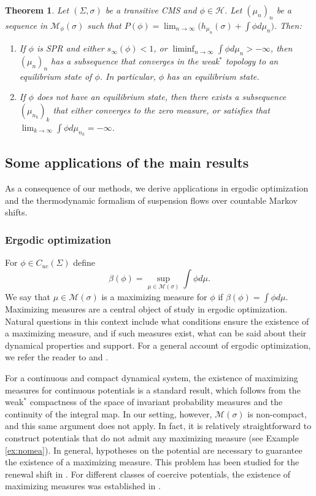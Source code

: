 \documentclass[letterpaper,11pt]{amsart}
\theoremstyle{plain}
\newtheorem{theorem}{Theorem}[section]
\theoremstyle{plain}
\theoremstyle{definition}
\theoremstyle{remark}
\def\M{{\mathcal M}}
\def\H{{\mathcal H}}
\begin{document}
\begin{theorem}\label{thm:2} Let $(\Sigma,\sigma)$ be a transitive CMS and $\phi\in\H$. Let $(\mu_n)_n$ be a sequence in $\M_{\phi}(\sigma)$ such that $P(\phi)=\lim_{n\to\infty} \big(h_{\mu_n}(\sigma)+\int \phi d\mu_n\big).$ Then:
\begin{enumerate}
\item\label{122} If $\phi$ is SPR and either $s_\infty(\phi)<1$, or $\liminf_{n\to\infty}\int \phi  d\mu_n>-\infty$, then  $(\mu_n)_n$ has a subsequence that converges in the weak$^*$ topology to an equilibrium state of $\phi$. In particular, $\phi$ has an equilibrium state.
\item \label{222} If $\phi$ does not have an equilibrium state, then there exists a subsequence  $(\mu_{n_k})_k$ that either converges to the zero measure, or satisfies that $\lim_{k\to\infty}\int \phi d\mu_{n_k}=-\infty$. 
\end{enumerate}
\end{theorem}


\subsection{Some applications of the main results} As a consequence of our methods, we derive applications in ergodic optimization and the thermodynamic formalism of suspension flows over countable Markov shifts. 

\subsubsection{Ergodic optimization} For $\phi\in C_{uc}(\Sigma)$ define $$\beta(\phi)=\sup_{\mu\in \M(\sigma)}\int \phi d\mu.$$ We say that $\mu\in\M(\sigma)$ is a maximizing measure for $\phi$ if $\beta(\phi)=\int \phi d\mu$.  Maximizing measures are a central object of study in ergodic optimization. Natural questions in this context include what conditions ensure the existence of a maximizing measure, and if such measures exist, what can be said about their dynamical properties and support. For a general account of ergodic optimization, we refer the reader to \cite{j} and  \cite{bo}.

For a continuous and compact dynamical system, the existence of maximizing measures for continuous potentials is a standard result, which follows from the weak$^*$ compactness of the space of invariant probability measures and the continuity of the integral map. In our setting, however, $\M(\sigma)$ is non-compact, and this same argument does not apply. In fact, it is relatively straightforward to construct potentials that do not admit any maximizing measure (see Example \ref{ex:nomea}). In general, hypotheses on the potential are necessary to guarantee the existence of a maximizing measure. This problem has been studied for the renewal shift in \cite{i}. For different classes of coercive potentials, the existence of maximizing measures was established in \cite{jmu, bf, fv}.  
\end{document}
